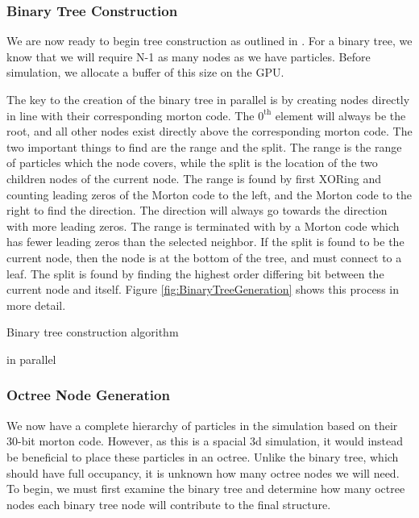 \documentclass{thesis}
\begin{document}
\subsubsection{Binary Tree Construction}
We are now ready to begin tree construction as outlined in \cite{Karas:2012}. For a binary tree, we know that we will require N-1 as many nodes as we have particles. Before simulation, we allocate a buffer of this size on the GPU.

The key to the creation of the binary tree in parallel is by creating nodes directly in line with their corresponding morton code. The $\text{0}^\text{th}$ element will always be the root, and all other nodes exist directly above the corresponding morton code. The two important things to find are the range and the split. The range is the range of particles which the node covers, while the split is the location of the two children nodes of the current node. The range is found by first XORing and counting leading zeros of the Morton code to the left, and the Morton code to the right to find the direction. The direction will always go towards the direction with more leading zeros. The range is terminated with by a Morton code which has fewer leading zeros than the selected neighbor. If the split is found to be the current node, then the node is at the bottom of the tree, and must connect to a leaf. The split is found by finding the highest order differing bit between the current node and itself. Figure \ref{fig:BinaryTreeGeneration} shows this process in more detail.

\begin{algorithm}
    \label{alg:BinaryTreeConstruction}
    \caption{Binary tree construction algorithm}
    \begin{algorithmic}
         in parallel
        \EndFor
    \end{algorithmic}
\end{algorithm}
\subsubsection{Octree Node Generation}
We now have a complete hierarchy of particles in the simulation based on their 30-bit morton code. However, as this is a spacial 3d simulation, it would instead be beneficial to place these particles in an octree. Unlike the binary tree, which should have full occupancy, it is unknown how many octree nodes we will need. To begin, we must first examine the binary tree and determine how many octree nodes each binary tree node will contribute to the final structure.
\end{document}
